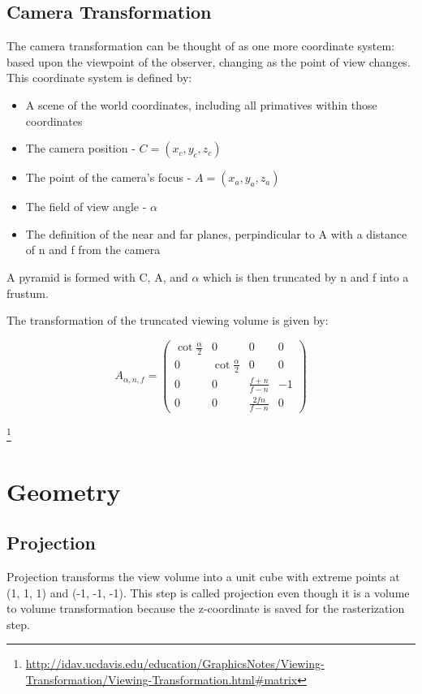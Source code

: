 \documentclass{article}
\begin{document}
\subsection{Camera Transformation}
The camera transformation can be thought of as one more coordinate system: based upon the viewpoint of the observer, changing as the point of view changes. This coordinate system is defined  by:

\begin{itemize}
\item A scene of the world coordinates, including all primatives within those coordinates
\item The camera position - $C = (x_{c}, y_{c}, z_{c})$
\item The point of the camera's focus - $A = (x_{a}, y_{a}, z_{a})$
\item The field of view angle - $\alpha$
\item The definition of the near and far planes, perpindicular to A with a distance of n and f from the camera
\end{itemize}

A pyramid is formed with C, A, and $\alpha$ which is then truncated by n and f into a frustum.

The transformation of the truncated viewing volume is given by:

\[A_{\alpha, n, f} = 
\begin{pmatrix}
\cot \frac{\alpha}{2} & 0 & 0 & 0 \\
0 & \cot \frac{\alpha}{2} & 0 & 0 \\
0 & 0 & \frac{f+n}{f-n} & -1 \\
0 & 0 & \frac{2fn}{f-n} & 0
\end{pmatrix}\]

\footnote{\url{http://idav.ucdavis.edu/education/GraphicsNotes/Viewing-Transformation/Viewing-Transformation.html\#matrix}}

\section{Geometry}

\subsection{Projection}
Projection transforms the view volume into a unit cube with extreme points at (1, 1, 1) and (-1, -1, -1). This step is called projection even though it is a volume to volume transformation because the z-coordinate is saved for the rasterization step.
\end{document}
